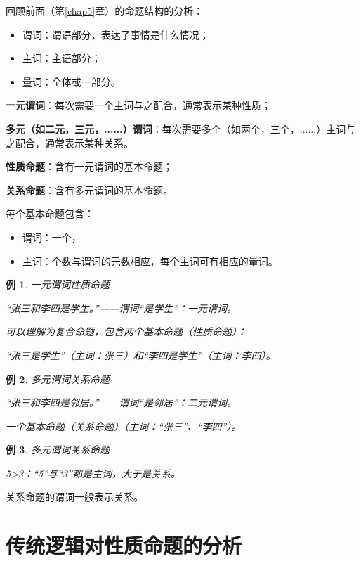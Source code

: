 \documentclass[12pt,onecolumn,a4paper]{book}
\newtheorem*{example}{例}
\numberwithin{table}{subsection}
\numberwithin{equation}{subsection}
\begin{document}
回顾前面（第\ref{chap5}章）的命题结构的分析：

\begin{itemize}[itemsep=0pt,parsep=0pt]
    \item 谓词：谓语部分，表达了事情是什么情况；
    \item 主词：主语部分；
    \item 量词：全体或一部分。
\end{itemize}

\textbf{一元谓词}：每次需要一个主词与之配合，通常表示某种性质；

\textbf{多元（如二元，三元，......）谓词}：每次需要多个（如两个，三个，......）主词与之配合，通常表示某种关系。

\textbf{性质命题}：含有一元谓词的基本命题；

\textbf{关系命题}：含有多元谓词的基本命题。

每个基本命题包含：
\begin{itemize}[itemsep=0pt,parsep=0pt]
    \item 谓词：一个，
    \item 主词：个数与谓词的元数相应，每个主词可有相应的量词。
\end{itemize}

\begin{example}
    一元谓词性质命题

    “张三和李四是学生。”——谓词“是学生”：一元谓词。

    可以理解为复合命题，包含两个基本命题（性质命题）：

    “张三是学生”（主词：张三）和“李四是学生”（主词：李四）。
\end{example}

\begin{example}
    多元谓词关系命题

    “张三和李四是邻居。”——谓词“是邻居”：二元谓词。
    
    一个基本命题（关系命题）（主词：“张三”、“李四”）。
\end{example}

\begin{example}
    多元谓词关系命题

    5>3：“5”与“3”都是主词，大于是关系。
\end{example}

关系命题的谓词一般表示关系。

\section{传统逻辑对性质命题的分析}
\end{document}
